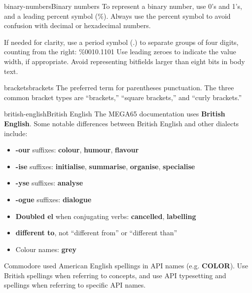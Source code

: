 \begin{sgentry}{binary-numbers}{Binary numbers}
    To represent a binary number, use 0's and 1's, and a leading percent symbol (\%). Always use the percent symbol to avoid confusion with decimal or hexadecimal numbers.

    If needed for clarity, use a period symbol (.) to separate groups of four digits, counting from the right: \%0010.1101 Use leading zeroes to indicate the value width, if appropriate. Avoid representing bitfields larger than eight bits in body text.
\end{sgentry}

\begin{sgentry}{brackets}{brackets}
    The preferred term for parentheses punctuation. The three common bracket types are ``brackets,'' ``square brackets,'' and ``curly brackets.''
\end{sgentry}

\begin{sgentry}{british-english}{British English}
    The MEGA65 documentation uses \textbf{British English}. Some notable differences between British English and other dialects include:

    \begin{itemize}
        \item \textbf{-our} suffixes: \textbf{colour}, \textbf{humour}, \textbf{flavour}
        \item \textbf{-ise} suffixes: \textbf{initialise}, \textbf{summarise}, \textbf{organise}, \textbf{specialise}
        \item \textbf{-yse} suffixes: \textbf{analyse}
        \item \textbf{-ogue} suffixes: \textbf{dialogue}
        \item \textbf{Doubled el} when conjugating verbs: \textbf{cancelled}, \textbf{labelling}
        \item \textbf{different to}, not ``different from'' or ``different than''
        \item Colour names: \textbf{grey}
    \end{itemize}

    Commodore used American English spellings in API names (e.g. \textbf{COLOR}). Use British spellings when referring to concepts, and use API typesetting and spellings when referring to specific API names.
\end{sgentry}

